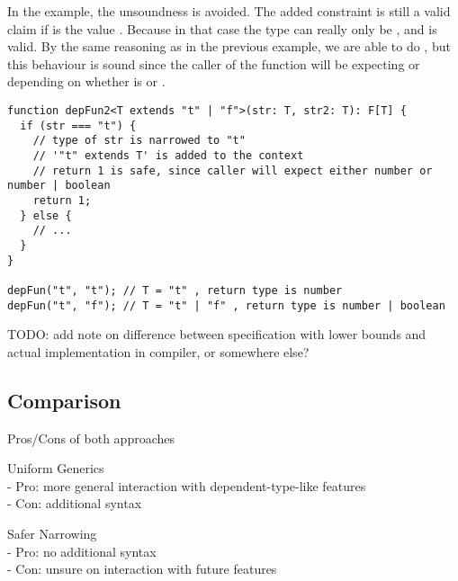 In the  example, the unsoundness is avoided. The added constraint  is still a valid claim if  is the value . Because in that case the type  can really only be , and  is valid. By the same reasoning as in the previous example, we are able to do , but this behaviour is sound since the caller of the function will be expecting  or  depending on whether  is  or .

\begin{lstlisting}
function depFun2<T extends "t" | "f">(str: T, str2: T): F[T] {
  if (str === "t") {
    // type of str is narrowed to "t"
    // '"t" extends T' is added to the context
    // return 1 is safe, since caller will expect either number or number | boolean
    return 1;
  } else {
    // ...
  }
}

depFun("t", "t"); // T = "t" , return type is number
depFun("t", "f"); // T = "t" | "f" , return type is number | boolean
\end{lstlisting}

TODO: add note on difference between specification with lower bounds and actual implementation in compiler, or somewhere else?

\subsection{Comparison}

Pros/Cons of both approaches

Uniform Generics
\\- Pro: more general interaction with dependent-type-like features
\\- Con: additional syntax

Safer Narrowing
\\- Pro: no additional syntax
\\- Con: unsure on interaction with future features
